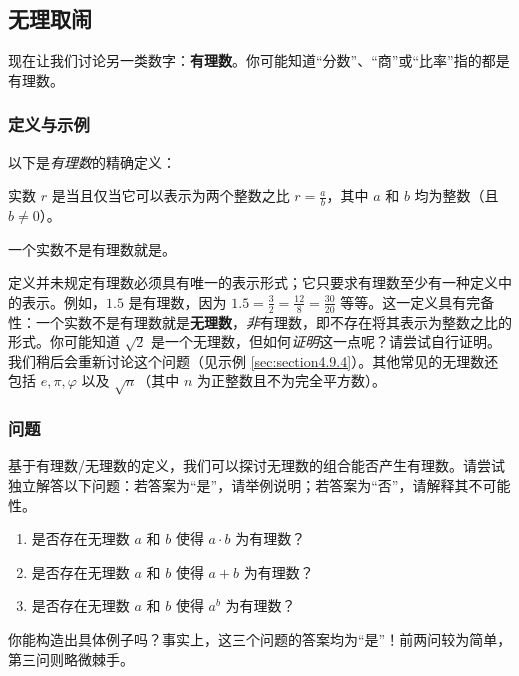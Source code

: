 \subsection{无理取闹}

现在让我们讨论另一类数字：\textbf{有理数}。你可能知道``分数''、``商''或``比率''指的都是有理数。

\subsubsection*{定义与示例}

以下是\emph{有理数}的精确定义：

\begin{definition}
    实数 $r$ 是当且仅当它可以表示为两个整数之比 $r = \frac{a}{b}$，其中 $a$ 和 $b$ 均为整数（且 $b \ne 0$）。

    一个实数不是有理数就是。
\end{definition}

定义并未规定有理数必须具有唯一的表示形式；它只要求有理数至少有一种定义中的表示。例如，$1.5$ 是有理数，因为 $1.5 = \frac{3}{2} = \frac{12}{8} = \frac{30}{20}$ 等等。这一定义具有完备性：一个实数不是有理数就是\textbf{无理数}，\emph{非}有理数，即不存在将其表示为整数之比的形式。你可能知道 $\sqrt{2}$ 是一个无理数，但如何\emph{证明}这一点呢？请尝试自行证明。我们稍后会重新讨论这个问题（见示例 \ref{sec:section4.9.4}）。其他常见的无理数还包括 $e, \pi, \varphi$ 以及 $\sqrt{n}$（其中 $n$ 为正整数且不为完全平方数）。

\subsubsection*{问题}

基于有理数/无理数的定义，我们可以探讨无理数的组合能否产生有理数。请尝试独立解答以下问题：若答案为``是''，请举例说明；若答案为``否''，请解释其不可能性。

\begin{enumerate}
    \item 是否存在无理数 $a$ 和 $b$ 使得 $a \cdot b$ 为有理数？
    \item 是否存在无理数 $a$ 和 $b$ 使得 $a + b$ 为有理数？
    \item 是否存在无理数 $a$ 和 $b$ 使得 $a^b$ 为有理数？
\end{enumerate}

你能构造出具体例子吗？事实上，这三个问题的答案均为``是''！前两问较为简单，第三问则略微棘手。

